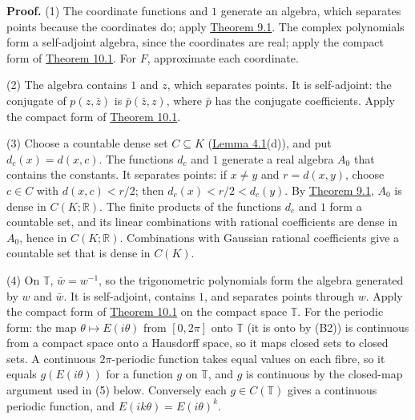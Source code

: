 \documentclass[
  english,
  11pt,
  a4paper,
]{article}
\begin{document}
\textbf{Proof.} (1) The coordinate functions and \(1\) generate an
algebra, which separates points because the coordinates do; apply
\hyperlink{the-stone-weierstrass-theorem-for-functions-vanishing-at-infinity--oa-fnd-sw-07}{Theorem
9.1}. The complex polynomials form a self-adjoint algebra, since the
coordinates are real; apply the compact form of
\hyperlink{the-stone-weierstrass-theorem-for-functions-vanishing-at-infinity--oa-fnd-sw-09}{Theorem
10.1}. For \(F\), approximate each coordinate.

(2) The algebra contains \(1\) and \(z\), which separates points. It is
self-adjoint: the conjugate of \(p(z,\bar z)\) is \(\bar p(\bar z,z)\),
where \(\bar p\) has the conjugate coefficients. Apply the compact form
of
\hyperlink{the-stone-weierstrass-theorem-for-functions-vanishing-at-infinity--oa-fnd-sw-09}{Theorem
10.1}.

(3) Choose a countable dense set \(C\subseteq K\)
(\hyperlink{the-stone-weierstrass-theorem-for-functions-vanishing-at-infinity--oa-fnd-sw-15}{Lemma
4.1}(d)), and put \(d_c(x)=d(x,c)\). The functions \(d_c\) and \(1\)
generate a real algebra \(A_0\) that contains the constants. It
separates points: if \(x\neq y\) and \(r=d(x,y)\), choose \(c\in C\)
with \(d(x,c)<r/2\); then \(d_c(x)<r/2<d_c(y)\). By
\hyperlink{the-stone-weierstrass-theorem-for-functions-vanishing-at-infinity--oa-fnd-sw-07}{Theorem
9.1}, \(A_0\) is dense in \(C(K;\mathbb R)\). The finite products of the
functions \(d_c\) and \(1\) form a countable set, and its linear
combinations with rational coefficients are dense in \(A_0\), hence in
\(C(K;\mathbb R)\). Combinations with Gaussian rational coefficients
give a countable set that is dense in \(C(K)\).

(4) On \(\mathbb T\), \(\bar w=w^{-1}\), so the trigonometric
polynomials form the algebra generated by \(w\) and \(\bar w\). It is
self-adjoint, contains \(1\), and separates points through \(w\). Apply
the compact form of
\hyperlink{the-stone-weierstrass-theorem-for-functions-vanishing-at-infinity--oa-fnd-sw-09}{Theorem
10.1} on the compact space \(\mathbb T\). For the periodic form: the map
\(\theta\mapsto E(i\theta)\) from \([0,2\pi]\) onto \(\mathbb T\) (it is
onto by (B2)) is continuous from a compact space onto a Hausdorff space,
so it maps closed sets to closed sets. A continuous \(2\pi\)-periodic
function takes equal values on each fibre, so it equals
\(g(E(i\theta))\) for a function \(g\) on \(\mathbb T\), and \(g\) is
continuous by the closed-map argument used in (5) below. Conversely each
\(g\in C(\mathbb T)\) gives a continuous periodic function, and
\(E(ik\theta)=E(i\theta)^k\).
\end{document}
